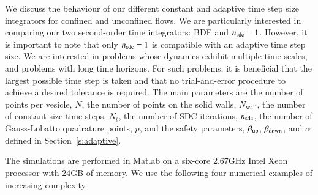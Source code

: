 We discuss the behaviour of our different constant and adaptive time
step size integrators for confined and unconfined flows.  We are
particularly interested in comparing our two second-order time
integrators: BDF and $n_{{\mathrm{sdc}}}=1$.  However, it is important to note
that only $n_{{\mathrm{sdc}}}=1$ is compatible with an adaptive time step size.
We are interested in problems whose dynamics exhibit multiple time
scales, and problems with long time horizons.  For such problems, it is
beneficial that the largest possible time step is taken and that no
trial-and-error procedure to achieve a desired tolerance is required.
The main parameters are the number of points per vesicle, $N$, the
number of points on the solid walls, $N_{\mathrm{wall}}$, the number of
constant size time steps, $N_{t}$, the number of SDC iterations,
$n_{{\mathrm{sdc}}}$, the number of Gauss-Lobatto quadrature points, $p$, and the
safety parameters, $\beta_{{\mathrm{up}}}$, $\beta_{{\mathrm{down}}}$, and $\alpha$ defined
in Section~\ref{s:adaptive}.

The simulations are performed in Matlab on a six-core 2.67GHz Intel Xeon
processor with 24GB of memory.  We use the following four numerical
examples of increasing complexity.

